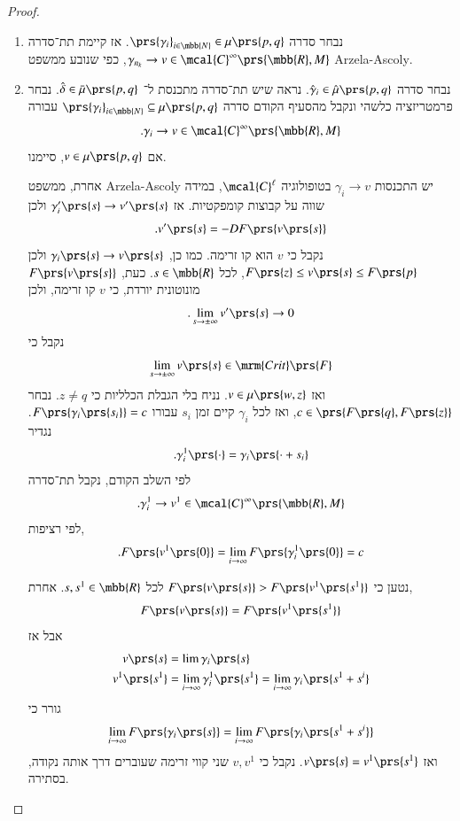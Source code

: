 \documentclass[a4paper,10pt,twoside,openany]{book}
\begin{document}
\begin{proof}
\begin{enumerate}
\item נבחר סדרה
$\prs{\gamma_i}_{i \in \mbb{N}} \in \mu\prs{p,q}$.
אז קיימת תת־סדרה
$\gamma_{n_k} \to v \in \mcal{C}^\infty\prs{\mbb{R},M}$,
כפי שנובע ממשפט
\textenglish{Arzela-Ascoly}.

\item נבחר סדרה
$\hat{\gamma}_i \in \hat{\mu}\prs{p,q}$.
נראה שיש תת־סדרה מתכנסת ל־%
$\hat{\delta} \in \bar{\mu}\prs{p,q}$.
נבחר פרמטריזציה כלשהי ונקבל מהסעיף הקודם סדרה
$\prs{\gamma_i}_{i \in \mbb{N}} \subseteq \mu\prs{p,q}$
עבורה
\[\text{.} \gamma_i \to v \in \mcal{C}^\infty\prs{\mbb{R},M}\]
אם
$v \in \mu\prs{p,q}$,
סיימנו.

אחרת, ממשפט
\textenglish{Arzela-Ascoly}
יש התכנסות
$\gamma_i \to v$
בטופולוגיה
$\mcal{C}^\ell$,
במידה שווה על קבוצות קומפקטיות.
אז
$\gamma_i'\prs{s} \to v'\prs{s}$
ולכן
\[\text{.} v'\prs{s} = -D F\prs{v\prs{s}}\]
נקבל כי
$v$
הוא קו זרימה.
כמו כן,
$\gamma_i\prs{s} \to v\prs{s}$
ולכן
$F\prs{z} \leq v\prs{s} \leq F\prs{p}$,
לכל
$s \in \mbb{R}$.
כעת,
$F\prs{v\prs{s}}$
מונוטונית יורדת, כי
$v$
קו זרימה, ולכן
\[\text{.} \lim_{s \to \pm \infty} v'\prs{s} \to 0\]
נקבל כי
\[\lim_{s \to \pm \infty} v\prs{s} \in \mrm{Crit}\prs{F}\]
ואז
$v \in \mu\prs{w,z}$.
נניח בלי הגבלת הכלליות כי
$z \neq q$.
נבחר
$c \in \prs{F\prs{q}, F\prs{z}}$,
ואז לכל
$\gamma_i$
קיים זמן
$s_i$
עבורו
$F\prs{\gamma_i\prs{s_i}} = c$.
נגדיר
\[\text{.} \gamma_i^1 \prs{\cdot} = \gamma_i\prs{\cdot + s_i}\]
לפי השלב הקודם, נקבל תת־סדרה
\[\text{.} \gamma_i^1 \to v^1 \in \mcal{C}^\infty \prs{\mbb{R},M}\]
לפי רציפות,
\[\text{.} F\prs{v^1\prs{0}} = \lim_{i \to \infty} F\prs{\gamma_i^1\prs{0}} = c\]

נטען כי
$F\prs{v\prs{s}} > F\prs{v^1\prs{s^1}}$
לכל
$s,s^1 \in \mbb{R}$.
אחרת,
\begin{align*}
F\prs{v\prs{s}} = F\prs{v^1\prs{s^1}}
\end{align*}
אבל אז
\begin{align*}
v\prs{s} &= \lim \gamma_i\prs{s} \\
v^1\prs{s^1} &= \lim_{i \to \infty} \gamma_i^1\prs{s^1} = \lim_{i\to\infty} \gamma_i\prs{s^1 + s^i}
\end{align*}
גורר כי
\[\lim_{i\to\infty} F\prs{\gamma_i\prs{s}} = \lim_{i\to\infty} F\prs{\gamma_i\prs{s^1 + s^i}}\]
ואז
$v\prs{s} = v^1\prs{s^1}$.
נקבל כי
$v, v^1$
שני קווי זרימה שעוברים דרך אותה נקודה, בסתירה.


\end{enumerate}
\end{proof}
\end{document}
